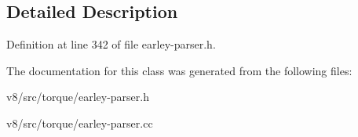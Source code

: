 \subsection{Detailed Description}


Definition at line 342 of file earley-\/parser.\+h.



The documentation for this class was generated from the following files\+:\begin{DoxyCompactItemize}
\item 
v8/src/torque/earley-\/parser.\+h\item 
v8/src/torque/earley-\/parser.\+cc\end{DoxyCompactItemize}
